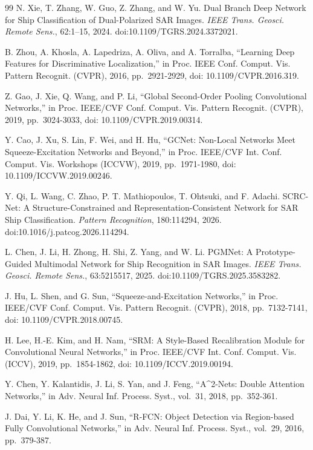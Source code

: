\documentclass[journal,10pt,a4paper]{IEEEtran}
\begin{document}
\begin{thebibliography}{99}
N. Xie, T. Zhang, W. Guo, Z. Zhang, and W. Yu. Dual Branch Deep Network for Ship Classification of Dual-Polarized SAR Images. \emph{IEEE Trans. Geosci. Remote Sens.}, 62:1--15, 2024. doi:10.1109/TGRS.2024.3372021.

B. Zhou, A. Khosla, A. Lapedriza, A. Oliva, and A. Torralba, ``Learning Deep Features for Discriminative Localization,'' in Proc. IEEE Conf. Comput. Vis. Pattern Recognit. (CVPR), 2016, pp.~2921-2929, doi: 10.1109/CVPR.2016.319.

Z. Gao, J. Xie, Q. Wang, and P. Li, ``Global Second-Order Pooling Convolutional Networks,'' in Proc. IEEE/CVF Conf. Comput. Vis. Pattern Recognit. (CVPR), 2019, pp.~3024-3033, doi: 10.1109/CVPR.2019.00314.

Y. Cao, J. Xu, S. Lin, F. Wei, and H. Hu, ``GCNet: Non-Local Networks Meet Squeeze-Excitation Networks and Beyond,'' in Proc. IEEE/CVF Int. Conf. Comput. Vis. Workshops (ICCVW), 2019, pp.~1971-1980, doi: 10.1109/ICCVW.2019.00246.

Y. Qi, L. Wang, C. Zhao, P. T. Mathiopoulos, T. Ohtsuki, and F. Adachi. SCRC-Net: A Structure-Constrained and Representation-Consistent Network for SAR Ship Classification. \emph{Pattern Recognition}, 180:114294, 2026. doi:10.1016/j.patcog.2026.114294.

L. Chen, J. Li, H. Zhong, H. Shi, Z. Yang, and W. Li. PGMNet: A Prototype-Guided Multimodal Network for Ship Recognition in SAR Images. \emph{IEEE Trans. Geosci. Remote Sens.}, 63:5215517, 2025. doi:10.1109/TGRS.2025.3583282.

J. Hu, L. Shen, and G. Sun, ``Squeeze-and-Excitation Networks,'' in Proc. IEEE/CVF Conf. Comput. Vis. Pattern Recognit. (CVPR), 2018, pp.~7132-7141, doi: 10.1109/CVPR.2018.00745.

H. Lee, H.-E. Kim, and H. Nam, ``SRM: A Style-Based Recalibration Module for Convolutional Neural Networks,'' in Proc. IEEE/CVF Int. Conf. Comput. Vis. (ICCV), 2019, pp.~1854-1862, doi: 10.1109/ICCV.2019.00194.

Y. Chen, Y. Kalantidis, J. Li, S. Yan, and J. Feng, ``A\^{}2-Nets: Double Attention Networks,'' in Adv. Neural Inf. Process. Syst., vol.~31, 2018, pp.~352-361.

J. Dai, Y. Li, K. He, and J. Sun, ``R-FCN: Object Detection via Region-based Fully Convolutional Networks,'' in Adv. Neural Inf. Process. Syst., vol.~29, 2016, pp.~379-387.


\end{thebibliography}
\end{document}
